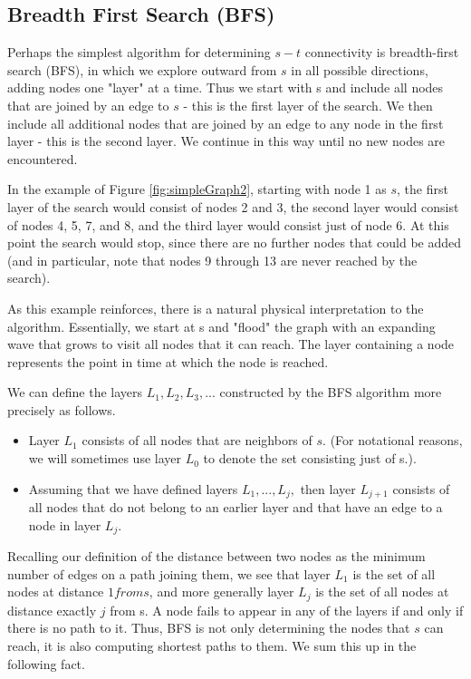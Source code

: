 \documentclass[12pt,a4paper]{book}
\begin{document}
\subsection{Breadth First Search (BFS)}
Perhaps the simplest algorithm for determining $s-t$ connectivity is breadth-first search (BFS), in which we explore outward from $s$ in all possible directions, adding nodes one "layer" at a time. Thus we start with s and include all nodes that are joined by an edge to $s$ - this is the first layer of the search. We then include all additional nodes that are joined by an edge to any node in the first layer - this is the second layer. We continue in this way until no new nodes are encountered.\par
In the example of Figure \ref{fig:simpleGraph2}, starting with node 1 as $s$, the first layer of the search would consist of nodes 2 and 3, the second layer would consist of nodes 4, 5, 7, and 8, and the third layer would consist just of node 6. At this point the search would stop, since there are no further nodes that could be added (and in particular, note that nodes 9 through 13 are never reached by the search).\par
As this example reinforces, there is a natural physical interpretation to the algorithm. Essentially, we start at s and "flood" the graph with an expanding wave that grows to visit all nodes that it can reach. The layer containing a node represents the point in time at which the node is reached.\par
We can define the layers $L_{1}, L_{2}, L_{3}, . . .$ constructed by the BFS algorithm more precisely as follows.
\begin{itemize}
\item Layer $L_{1}$ consists of all nodes that are neighbors of $s$. (For notational reasons, we will sometimes use layer $L_{0}$ to denote the set consisting just of s.).
\item Assuming that we have defined layers $L_{1}, . . . , L_{j},$ then layer $L_{j+1}$ consists of all nodes that do not belong to an earlier layer and that have an edge to a node in layer $L_{j}$.
\end{itemize}
Recalling our definition of the distance between two nodes as the minimum number of edges on a path joining them, we see that layer $L_{1}$ is the set of all nodes at distance $1 from s$, and more generally layer $L_{j}$ is the set of all nodes at distance exactly $j$ from s. A node fails to appear in any of the layers if and only if there is no path to it. Thus, BFS is not only determining the nodes that $s$ can reach, it is also computing shortest paths to them. We sum this up in the following fact.
\end{document}
